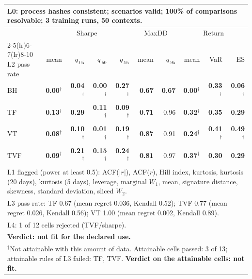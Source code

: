 \begin{tabular}{lrrrrrrrrr}
\toprule
\multicolumn{10}{p{13.5cm}}{L0: process hashes consistent; scenarios valid; 100\% of comparisons resolvable; 3 training runs, 50 contexts.} \\
\midrule
 & \multicolumn{4}{c}{Sharpe} & \multicolumn{2}{c}{MaxDD} & \multicolumn{3}{c}{Return} \\
\cmidrule(lr){2-5}\cmidrule(lr){6-7}\cmidrule(lr){8-10}
L2 pass rate & mean & $q_{.05}$ & $q_{.50}$ & $q_{.95}$ & mean & $q_{.95}$ & mean & VaR & ES \\
\midrule
BH & \textbf{0.00}$^{\dagger}$ & \textbf{0.04}$^{\dagger}$ & \textbf{0.00}$^{\dagger}$ & \textbf{0.27}$^{\dagger}$ & \textbf{0.67} & \textbf{0.67} & \textbf{0.00}$^{\dagger}$ & \textbf{0.33}$^{\dagger}$ & \textbf{0.06}$^{\dagger}$ \\
TF & \textbf{0.13}$^{\dagger}$ & \textbf{0.29} & \textbf{0.11}$^{\dagger}$ & \textbf{0.09}$^{\dagger}$ & \textbf{0.71} & 0.96 & \textbf{0.32}$^{\dagger}$ & \textbf{0.35} & \textbf{0.29} \\
VT & \textbf{0.08}$^{\dagger}$ & \textbf{0.10}$^{\dagger}$ & \textbf{0.01}$^{\dagger}$ & \textbf{0.19}$^{\dagger}$ & \textbf{0.87} & 0.91 & \textbf{0.24}$^{\dagger}$ & \textbf{0.41}$^{\dagger}$ & \textbf{0.49}$^{\dagger}$ \\
TVF & \textbf{0.09}$^{\dagger}$ & \textbf{0.21}$^{\dagger}$ & \textbf{0.15}$^{\dagger}$ & \textbf{0.24}$^{\dagger}$ & \textbf{0.81} & 0.97 & \textbf{0.37}$^{\dagger}$ & \textbf{0.30} & \textbf{0.29} \\
\midrule
\multicolumn{10}{p{13.5cm}}{L1 flagged (power at least 0.5): ACF($|r|$), ACF($r$), Hill index, kurtosis, kurtosis (20 days), kurtosis (5 days), leverage, marginal $W_1$, mean, signature distance, skewness, standard deviation, sliced $W_2$.} \\
\multicolumn{10}{p{13.5cm}}{L3 pass rate: TF 0.67 (mean regret 0.036, Kendall 0.52); TVF 0.77 (mean regret 0.026, Kendall 0.56); VT 1.00 (mean regret 0.002, Kendall 0.89).} \\
\multicolumn{10}{p{13.5cm}}{L4: 1 of 12 cells rejected (TVF/sharpe).} \\
\multicolumn{10}{p{13.5cm}}{\textbf{Verdict: not fit for the declared use.}} \\
\multicolumn{10}{p{13.5cm}}{$^{\dagger}$Not attainable with this amount of data. Attainable cells passed: 3 of 13; attainable rules of L3 failed: TF, TVF. \textbf{Verdict on the attainable cells: not fit.}} \\
\bottomrule
\end{tabular}
